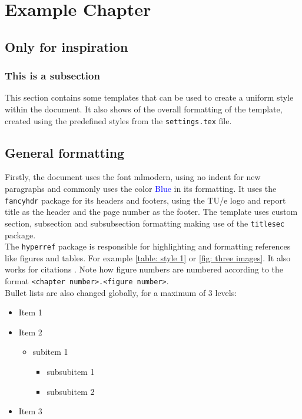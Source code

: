 \chapter{Example Chapter}
\section{Only for inspiration}

\subsection{This is a subsection}
This section contains some templates that can be used to create a uniform style within the document. It also shows of the overall formatting of the template, created using the predefined styles from the \texttt{settings.tex} file.

\section{General formatting}
Firstly, the document uses the font mlmodern, using no indent for new paragraphs and commonly uses the color \textcolor{blue}{Blue} in its formatting. It uses the \texttt{fancyhdr} package for its headers and footers, using the TU/e logo and report title as the header and the page number as the footer. The template uses custom section, subsection and subsubsection formatting making use of the \texttt{titlesec} package.\\
The \texttt{hyperref} package is responsible for highlighting and formatting references like figures and tables. For example \cref{table: style 1} or \cref{fig: three images}. It also works for citations \cite{texbook}. Note how figure numbers are numbered according to the format \texttt{<chapter number>.<figure number>}.\\

Bullet lists are also changed globally, for a maximum of 3 levels:

\begin{itemize}
    \item Item 1
    \item Item 2
    \begin{itemize}
        \item subitem 1
        \begin{itemize}
            \item subsubitem 1
            \item subsubitem 2
        \end{itemize}
    \end{itemize}
    \item Item 3
\end{itemize}

